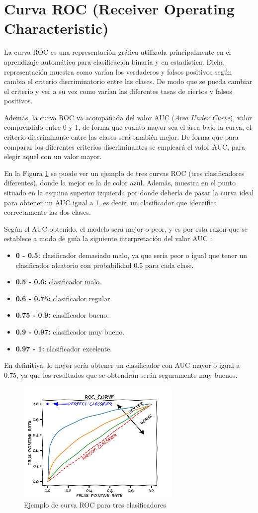 \section{Curva ROC (Receiver Operating Characteristic)}
La curva ROC \cite{MARTINEZPEREZ2023101821} es una representación gráfica utilizada principalmente en el aprendizaje automático para clasificación binaria y en estadística. Dicha representación muestra como varían los verdaderos y falsos positivos según cambia el criterio discriminatorio entre las clases. De modo que se pueda cambiar el criterio y ver a su vez como varían las diferentes tasas de ciertos y falsos positivos.

Además, la curva ROC va acompañada del valor AUC (\emph{Area Under Curve}), valor comprendido entre 0 y 1, de forma que cuanto mayor sea el área bajo la curva, el criterio discriminante entre las clases será también mejor. De forma que para comparar los diferentes criterios discriminantes se empleará el valor AUC, para elegir aquel con un valor mayor. 

En la Figura \ref{f:ejemploroc} se puede ver un ejemplo de tres curvas ROC (tres clasificadores diferentes), donde la mejor es la de color azul. Además, muestra en el punto situado en la esquina superior izquierda por donde debería de pasar la curva ideal para obtener un AUC igual a 1, es decir, un clasificador que identifica correctamente las dos clases.

Según el AUC obtenido, el modelo será mejor o peor, y es por esta razón que se establece a modo de guía la siguiente interpretación del valor AUC \cite{eswiki:curvaROC}:
\begin{itemize}
    \item \textbf{0 - 0.5:} clasificador demasiado malo, ya que sería peor o igual que tener un clasificador aleatorio con probabilidad 0.5 para cada clase.
    \item \textbf{0.5 - 0.6:} clasificador malo.
    \item \textbf{0.6 - 0.75:} clasificador regular.
    \item \textbf{0.75 - 0.9:} clasificador bueno.
    \item \textbf{0.9 - 0.97:} clasificador muy bueno.
    \item \textbf{0.97 - 1:} clasificador excelente.
\end{itemize}
En definitiva, lo mejor sería obtener un clasificador con AUC mayor o igual a 0.75, ya que los resultados que se obtendrán serán seguramente muy buenos.

\begin{figure}[h]
 \centering
  \includegraphics[width=0.7\textwidth]{img/curvaROC.png}
 \caption{Ejemplo de curva ROC para tres clasificadores \cite{wiki:ejemploroc}}
 \label{f:ejemploroc}
\end{figure}





